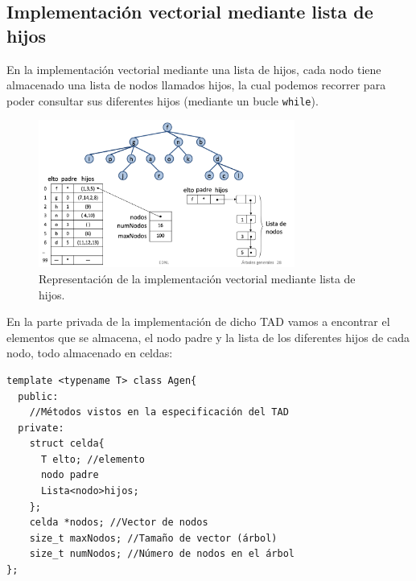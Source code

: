 \subsection{Implementación vectorial mediante lista de hijos}
En la implementación vectorial mediante una lista de hijos, cada nodo tiene almacenado una lista de nodos llamados hijos, la cual podemos recorrer para poder consultar sus diferentes hijos (mediante un bucle \texttt{while}).

\begin{figure}[h]
  \begin{center}
    \includegraphics[width=0.75\textwidth]{assets/AgenVec1.png}
  \end{center}
  \caption{Representación de la implementación vectorial mediante lista de hijos.}
\end{figure}

En la parte privada de la implementación de dicho TAD vamos a encontrar el elementos que se almacena, el nodo padre y la lista de los diferentes hijos de cada nodo, todo almacenado en celdas:
\begin{verbatim}
template <typename T> class Agen{
  public:
    //Métodos vistos en la especificación del TAD
  private:
    struct celda{
      T elto; //elemento
      nodo padre
      Lista<nodo>hijos;
    };
    celda *nodos; //Vector de nodos
    size_t maxNodos; //Tamaño de vector (árbol)
    size_t numNodos; //Número de nodos en el árbol
};
\end{verbatim}

